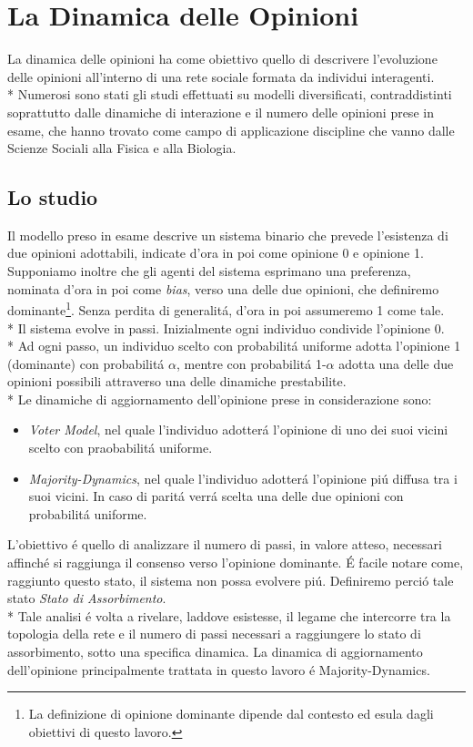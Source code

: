 \documentclass[../Tesi.tex]{subfiles}
\begin{document}
\chapter{La Dinamica delle Opinioni}
La dinamica delle opinioni ha come obiettivo quello di descrivere l'evoluzione delle opinioni all'interno di una rete sociale formata da individui interagenti.\\*
Numerosi sono stati gli studi effettuati su modelli diversificati, contraddistinti soprattutto dalle dinamiche di interazione e il numero delle opinioni prese in esame, che hanno trovato come campo di applicazione discipline che vanno dalle Scienze Sociali alla Fisica e alla Biologia.

\section{Lo studio}
Il modello preso in esame descrive un sistema binario che prevede l'esistenza di due opinioni adottabili, indicate d'ora in poi come opinione 0 e opinione 1. Supponiamo inoltre che gli agenti del sistema esprimano una preferenza, nominata d'ora in poi come \emph{bias}, verso una delle due opinioni, che definiremo dominante\footnote{La definizione di opinione dominante dipende dal contesto ed esula dagli obiettivi di questo lavoro.}. Senza perdita di generalit\'a, d'ora in poi assumeremo 1 come tale.\\*
Il sistema evolve in passi. Inizialmente ogni individuo condivide l'opinione 0.\\*
Ad ogni passo, un individuo scelto con probabilit\'a uniforme adotta l'opinione 1 (dominante) con probabilit\'a $\alpha$, mentre con probabilit\'a 1-$\alpha$ adotta una delle due opinioni possibili attraverso una delle dinamiche prestabilite.\\*
Le dinamiche di aggiornamento dell'opinione prese in considerazione sono:
\begin{itemize}
\item \emph{Voter Model}, nel quale l'individuo adotter\'a l'opinione di uno dei suoi vicini scelto con praobabilit\'a uniforme.
\item \emph{Majority-Dynamics}, nel quale l'individuo adotter\'a l'opinione pi\'u diffusa tra i suoi vicini. In caso di parit\'a verr\'a scelta una delle due opinioni con probabilit\'a uniforme.
\end{itemize}
L'obiettivo \'e quello di analizzare il numero di passi, in valore atteso, necessari affinch\'e si raggiunga il consenso verso l'opinione dominante. \'E facile notare come, raggiunto questo stato, il sistema non possa evolvere pi\'u. Definiremo perci\'o tale stato \emph{Stato di Assorbimento}.\\*
Tale analisi \'e volta a rivelare, laddove esistesse, il legame che intercorre tra la topologia della rete e il numero di passi necessari a raggiungere lo stato di assorbimento, sotto una specifica dinamica.
La dinamica di aggiornamento dell'opinione principalmente trattata in questo lavoro \'e Majority-Dynamics.
\end{document}
